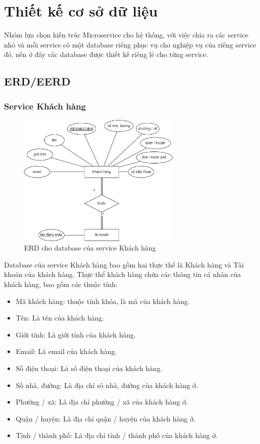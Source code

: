 \section{Thiết kế cơ sở dữ liệu}
\par Nhóm lựa chọn kiến trúc Microservice cho hệ thống, với việc chia ra các service nhỏ và mỗi service có một database riêng phục vụ cho nghiệp vụ của riêng service đó, nên ở đây các database được thiết kế riêng lẻ cho từng service.

\subsection{ERD/EERD}
\subsubsection{Service Khách hàng}
\begin{figure}[!htp]
	\begin{center}
		\includegraphics[width=0.7\textwidth]{img/database/erd/eerd-customer.png}
		\newline
		\caption{ERD cho database của service Khách hàng}
	\end{center}
\end{figure}

\par Database của service Khách hàng bao gồm hai thực thể là Khách hàng và Tài khoản của khách hàng. Thực thể khách hàng chứa các thông tin cá nhân của khách hàng, bao gồm các thuộc tính:
\begin{itemize}
	\item Mã khách hàng: thuộc tính khóa, là mã của khách hàng.
	\item Tên: Là tên của khách hàng.
	\item Giới tính: Là giới tính của khách hàng.
	\item Email: Là email của khách hàng.
	\item Số điện thoại: Là số điện thoại của khách hàng.
	\item Số nhà, đường: Là địa chỉ sô nhà, đường của khách hàng ở.
	\item Phường / xã: Là địa chỉ phường / xã của khách hàng ở.
	\item Quận / huyện: Là địa chỉ quận / huyện của khách hàng ở.
	\item Tỉnh / thành phố: Là địa chỉ tỉnh / thành phố của khách hàng ở.
\end{itemize}


